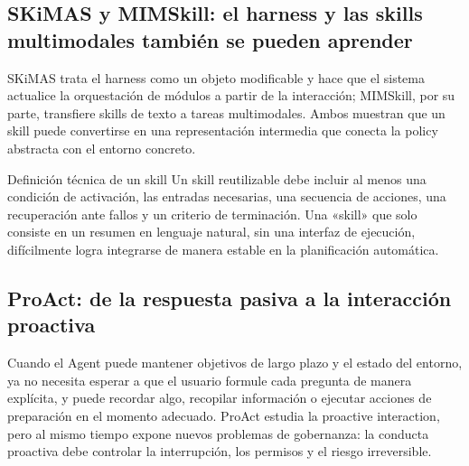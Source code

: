 \subsection{SKiMAS y MIMSkill: el harness y las skills multimodales también se pueden aprender}

SKiMAS trata el harness como un objeto modificable y hace que el sistema actualice la orquestación de módulos a partir de la interacción; MIMSkill, por su parte, transfiere skills de texto a tareas multimodales. Ambos muestran que un skill puede convertirse en una representación intermedia que conecta la policy abstracta con el entorno concreto.




\begin{knowledgebox}{Definición técnica de un skill}
Un skill reutilizable debe incluir al menos una condición de activación, las entradas necesarias, una secuencia de acciones, una recuperación ante fallos y un criterio de terminación. Una «skill» que solo consiste en un resumen en lenguaje natural, sin una interfaz de ejecución, difícilmente logra integrarse de manera estable en la planificación automática.
\end{knowledgebox}

\subsection{ProAct: de la respuesta pasiva a la interacción proactiva}

Cuando el Agent puede mantener objetivos de largo plazo y el estado del entorno, ya no necesita esperar a que el usuario formule cada pregunta de manera explícita, y puede recordar algo, recopilar información o ejecutar acciones de preparación en el momento adecuado. ProAct estudia la proactive interaction, pero al mismo tiempo expone nuevos problemas de gobernanza: la conducta proactiva debe controlar la interrupción, los permisos y el riesgo irreversible.


